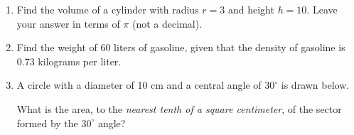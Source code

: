 \documentclass[12pt, twoside]{article}
\begin{document}
\begin{enumerate}
  \item Find the volume of a cylinder with radius $r=3$ and height $h=10$. Leave your answer in terms of $\pi$ (not a decimal). \vspace{2.5cm}

  \item Find the weight of $60$ liters of gasoline, given that the density of gasoline is $0.73$ kilograms per liter. \vspace{3.0cm}

  \item A circle with a diameter of 10 cm and a central angle of $30^\circ$ is drawn below.
       \begin{center}
     \end{center}
  What is the area, to the \emph{nearest tenth of a square centimeter}, of the sector formed by the $30^\circ$ angle?

\end{enumerate}
\end{document}
